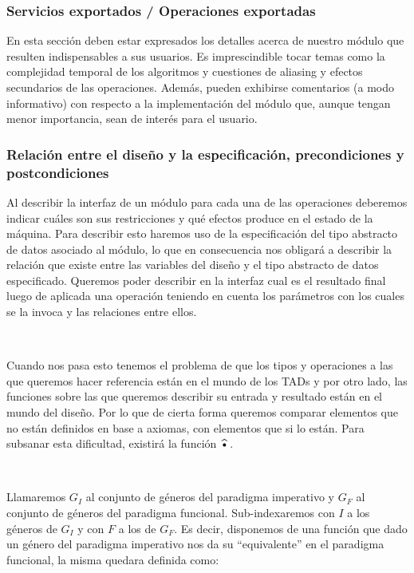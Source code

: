 \subsubsection{Servicios exportados / Operaciones exportadas}

En esta secci\'on deben estar expresados los detalles acerca de nuestro m\'odulo que resulten indispensables a sus usuarios. Es imprescindible tocar temas como la complejidad temporal de los algoritmos y cuestiones de aliasing y efectos secundarios de las operaciones. Adem\'as, pueden exhibirse comentarios (a modo informativo) con respecto a la implementaci\'on del m\'odulo que, aunque tengan menor importancia, sean de inter\'es para el usuario.

\subsubsection{Relaci\'on entre el dise\~no y la especificaci\'on, precondiciones y postcondiciones}

Al describir la interfaz de un m\'odulo para cada una de las operaciones deberemos indicar cu\'ales son sus restricciones y qu\'e efectos produce en el estado de la m\'aquina. Para describir esto haremos uso de la especificaci\'on del tipo abstracto de datos asociado al m\'odulo, lo que en consecuencia nos obligar\'a a describir la relaci\'on que existe entre las variables del dise\~no y el tipo abstracto de datos especificado. Queremos poder describir en la interfaz cual es el resultado final luego de aplicada una operaci\'on teniendo en cuenta los par\'ametros con los cuales se la invoca y las relaciones entre ellos.

~

Cuando nos pasa esto tenemos el problema de que los tipos y operaciones a las que queremos hacer referencia est\'an en el mundo de los TADs y por otro lado, las funciones sobre las que queremos describir su entrada y resultado est\'an en el mundo del dise\~no. Por lo que de cierta forma queremos comparar elementos que no est\'an definidos en base a axiomas, con elementos que si lo est\'an. Para subsanar esta dificultad, existir\'a la funci\'on $\widehat{\text{\textbullet}}$.

~

Llamaremos $G_I$ al conjunto de g\'eneros del paradigma imperativo y $G_F$ al conjunto de g\'eneros del paradigma funcional. Sub-indexaremos con $I$ a los g\'eneros de $G_I$ y con $F$ a los de $G_F$. Es decir, disponemos de una funci\'on que dado un g\'enero del paradigma imperativo nos da su ``equivalente'' en el paradigma funcional, la misma quedara definida como:

